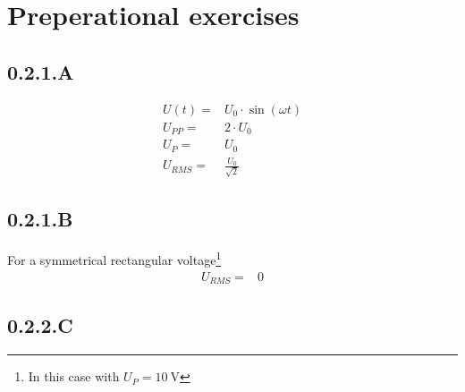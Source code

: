 \section{Preperational exercises}
\subsection*{0.2.1.A}
\begin{eqnarray*}
U(t)=&U_0\cdot\sin(\omega t)\\
U_{PP}=&2\cdot U_0\\
U_P=&U_0\\
U_{RMS}=&\frac{U_0}{\sqrt{2}}
\end{eqnarray*}
\subsection*{0.2.1.B}
For a symmetrical rectangular voltage\footnote{In this case with $U_P=\SI{10}{\volt}$} 
\begin{eqnarray*}
	U_{RMS}=&0
\end{eqnarray*}
\subsection*{0.2.2.C}
